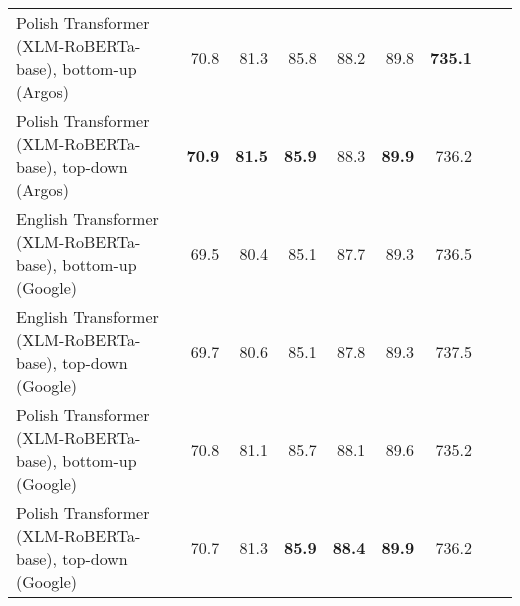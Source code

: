 \begin{table}[ht!]
{\begin{tabular}{lrrrrrrrr}
  Polish Transformer (XLM-RoBERTa-base), bottom-up (Argos) & 70.8 & 81.3 & 85.8 & 88.2 & 89.8 & \textbf{735.1} \\ 
  Polish Transformer (XLM-RoBERTa-base), top-down (Argos) & \textbf{70.9} & \textbf{81.5} & \textbf{85.9} & 88.3 & \textbf{89.9} & 736.2 \\ 
  English Transformer (XLM-RoBERTa-base), bottom-up (Google) & 69.5 & 80.4 & 85.1 & 87.7 & 89.3 & 736.5 \\ 
  English Transformer (XLM-RoBERTa-base), top-down (Google) & 69.7 & 80.6 & 85.1 & 87.8 & 89.3 & 737.5 \\ 
  Polish Transformer (XLM-RoBERTa-base), bottom-up (Google) & 70.8 & 81.1 & 85.7 & 88.1 & 89.6 & 735.2 \\ 
  Polish Transformer (XLM-RoBERTa-base), top-down (Google) & 70.7 & 81.3 & \textbf{85.9} & \textbf{88.4} & \textbf{89.9} & 736.2 \\ 
   \hline
\end{tabular}
}
\end{table}




